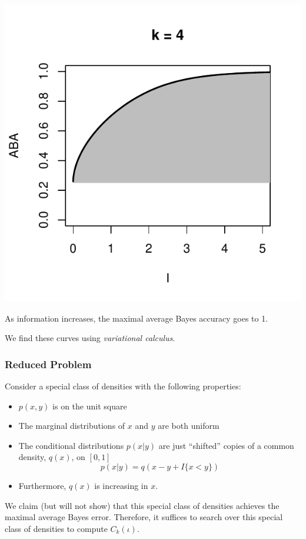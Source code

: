\documentclass{beamer}
\begin{document}
\begin{frame}
\begin{center}
\includegraphics[scale = 0.34]{ck_4.pdf}
\end{center}
As information increases, the maximal average Bayes accuracy goes to 1.

We find these curves using \emph{variational calculus}.
\end{frame}

\begin{frame}
\frametitle{Reduced Problem}

Consider a special class of densities with the following properties:
\begin{itemize}
\item $p(x, y)$ is on the unit square
\item The marginal distributions of $x$ and $y$ are both uniform
\item The conditional distributions $p(x|y)$ are just ``shifted'' copies of a common density, $q(x)$, on $[0,1]$
\[
p(x|y) = q(x - y + I\{x < y\})
\]
\item Furthermore, $q(x)$ is increasing in $x$.
\end{itemize}

We claim (but will not show) that this special class of densities
achieves the maximal average Bayes error.  Therefore, it suffices to
search over this special class of densities to compute $C_k(\iota)$.
\end{frame}
\end{document}

